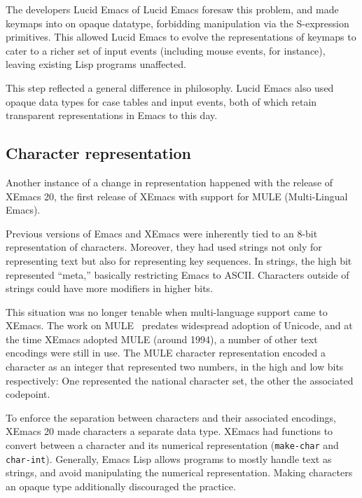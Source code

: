 \documentclass[format=acmsmall, review=false, screen=true]{acmart}
\begin{document}
The developers Lucid Emacs of Lucid Emacs foresaw this problem, and
made keymaps into on opaque datatype, forbidding manipulation via the
S-expression primitives.  This allowed Lucid Emacs to evolve the
representations of keymaps to cater to a richer set of input events
(including mouse events, for instance), leaving existing Lisp programs
unaffected.

This step reflected a general difference in philosophy.  Lucid Emacs
also used opaque data types for case tables and input events, both of
which retain transparent representations in Emacs to this day.

\subsection{Character representation}

Another instance of a change in representation happened with the
release of XEmacs 20, the first release of XEmacs with support for
MULE (Multi-Lingual Emacs).

Previous versions of Emacs and XEmacs were inherently tied to an 8-bit
representation of characters.  Moreover, they had used strings not
only for representing text but also for representing key sequences.
In strings, the high bit represented ``meta,'' basically restricting
Emacs to ASCII.  Characters outside of strings could have more
modifiers in higher bits.

This situation was no longer tenable when multi-language support came
to XEmacs.  The work on MULE~\cite{Ohmaki2002} predates widespread
adoption of Unicode, and at the time XEmacs adopted MULE (around
1994), a number of other text encodings were still in use.  The MULE
character representation encoded a character as an integer that
represented two numbers, in the high and low bits respectively: One
represented the national character set, the other the associated
codepoint.

To enforce the separation between characters and their associated
encodings, XEmacs 20 made characters a separate data type.  XEmacs had
functions to convert between a character and its numerical
representation (\texttt{make-char} and \texttt{char-int}).  Generally,
Emacs Lisp allows programs to mostly handle text as strings,
and avoid manipulating the numerical representation.  Making
characters an opaque type additionally discouraged the practice.


\end{document}
